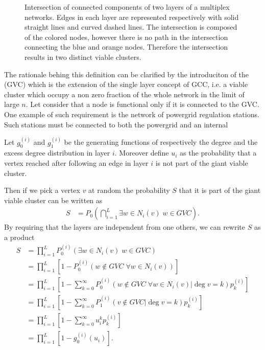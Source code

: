 \documentclass[
11pt, %
english, %
singlespacing, %
nolistspacing, %
liststotoc, %
headsepline, %
]{MastersDoctoralThesis} %
\begin{document}
\begin{figure}
	
	\caption{Intersection of connected components of two layers of a multiplex networks. Edges in each layer are represented respectively with solid straight lines and curved dashed lines. The intersection is composed of the colored nodes, however there is no path in the intersection connecting the blue and orange nodes. Therefore the intersection results in two distinct viable clusters.}
	\label{Figure: Intersection of connected is not viable}
\end{figure}

The rationale behing this definition can be clarified by the introduciton of the  (GVC) which is the extension of the single layer concept of GCC, i.e. a viable cluster which occupy a non zero fraction of the whole network in the limit of large $n$. Let consider that a node is functional only if it is connected to the GVC. One example of such requirement is the network of powergrid regulation stations. Such stations must be connected to both the powergrid and an internal

Let $g_0^{(i)}$ and $g_1^{(i)}$ be the generating functions of respectively the degree and the excess degree distribution in layer $i$. Moreover define $u_i$ as the probability that a vertex reached after following an edge in layer $i$ is not part of the giant viable cluster.

Then if we pick a vertex $v$ at random the probability $S$ that it is part of the giant viable cluster can be written as
\begin{align}
	S &= P_0\left(\bigcap_{i = 1}^{L} \exists w \in N_i(v) \; w \in GVC \right).
\end{align}
By requiring that the layers are independent from one others, we can rewrite $S$ as a product
\begin{align}
	S &= \prod_{i = 1}^{L}  P_0^{(i)}\left(\exists w \in N_i(v) \; w \in GVC\right) \\
		&=\prod_{i = 1}^{L}  \left[1 - P_0^{(i)}\left(w \notin GVC \; \forall w \in N_i(v)\right) \right] \\
		&=\prod_{i = 1}^{L}  \left[1 - \sum_{k = 0}^{\infty} P_0^{(i)}\left(w \notin GVC \; \forall w \in N_i(v) | \deg{v} = k \right) p^{(i)}_k \right] \\
		&=\prod_{i = 1}^{L}  \left[1 - \sum_{k = 0}^{\infty} P_1^{(i)}\left(v \notin GVC | \deg{v} = k \right) p^{(i)}_k \right] \\
		&=\prod_{i = 1}^{L}  \left[1 - \sum_{k = 0}^{\infty} u_i^k p^{(i)}_k \right] \\
		&=\prod_{i = 1}^{L}  \left[1 - g_0^{(i)}(u_i) \right].\label{Multiplex GCC size final}
\end{align}
\end{document}
